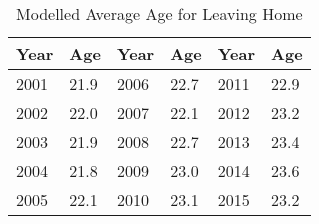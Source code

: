 \begin{table}[htpb]
\centering
\caption{Modelled Average Age for Leaving Home} 
\label{age-3-cols}
\begin{tabular}{p{1.3cm}p{1.3cm}p{1.3cm}p{1.3cm}p{1.3cm}p{1.3cm}}
  \toprule
Year & Age & Year & Age & Year & Age \\ 
  \midrule
2001 & 21.9 & 2006 & 22.7 & 2011 & 22.9 \\ 
  2002 & 22.0 & 2007 & 22.1 & 2012 & 23.2 \\ 
  2003 & 21.9 & 2008 & 22.7 & 2013 & 23.4 \\ 
  2004 & 21.8 & 2009 & 23.0 & 2014 & 23.6 \\ 
  2005 & 22.1 & 2010 & 23.1 & 2015 & 23.2 \\ 
   \bottomrule
\end{tabular}
\end{table}
